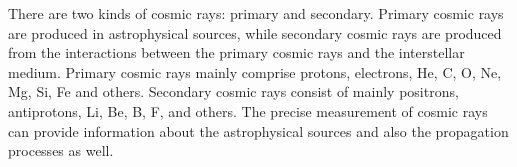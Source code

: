 There are two kinds of cosmic rays: primary and secondary. Primary cosmic rays are produced in astrophysical sources, while secondary cosmic rays are produced from the interactions between the primary cosmic rays and the interstellar medium. Primary cosmic rays mainly comprise protons, electrons, He, C, O, Ne, Mg, Si, Fe and others. Secondary cosmic rays consist of mainly positrons, antiprotons, Li, Be, B, F, and others. The precise measurement of cosmic rays can provide information about the astrophysical sources and also the propagation processes as well. \par

